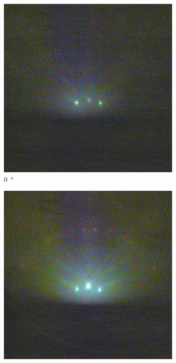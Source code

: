  \newpage
\begin{figure}
    \centering
    \begin{subfigure}{0.2\linewidth}
        \includegraphics[width=\textwidth]{../data/edited/1_1_7deg.pdf}
        \caption{\qty{0}{\degree}}
    \end{subfigure}
    \begin{subfigure}{0.2\linewidth}
        \includegraphics[width=\textwidth]{../data/edited/1_1_97deg.pdf}

\end{subfigure}
\end{figure}
